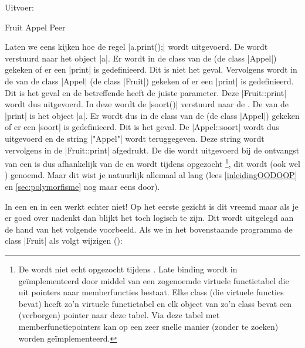 \begin{cpplstShortInline}
Uitvoer:
\begin{coutput}
Fruit
Appel
Peer
\end{coutput}

Laten we eens kijken hoe de regel |a.print();| wordt uitgevoerd.
De   wordt verstuurd naar het object |a|.
Er wordt in de class van de  (de class |Appel|) gekeken of er een  |print| is gedefinieerd.
Dit is niet het geval.
Vervolgens wordt in de  van de class |Appel| (de class |Fruit|) gekeken of er een  |print| is gedefinieerd.
Dit is het geval en de betreffende  heeft de juiste parameter.
Deze  |Fruit::print| wordt dus uitgevoerd.
In deze  wordt de  |soort()| verstuurd naar de .
De  van de  |print| is het object |a|.
Er wordt dus in de class van de  (de class |Appel|) gekeken of er een  |soort| is gedefinieerd.
Dit is het geval. 
De  |Appel::soort| wordt dus uitgevoerd en de string |"Appel"| wordt teruggegeven.
Deze string wordt vervolgens in de  |Fruit::print| afgedrukt.
De  die wordt uitgevoerd bij de ontvangst van een  is dus afhankelijk van de  en wordt tijdens  opgezocht%
\footnote{%
    De  wordt niet echt opgezocht tijdens . 
    Late binding wordt in \Cpp{} geïmplementeerd door middel van een zogenoemde virtuele functietabel die uit pointers naar memberfuncties bestaat.
    Elke class (die virtuele functies bevat) heeft zo'n virtuele functietabel en elk object van zo'n class bevat een (verborgen) pointer naar deze tabel.
    Via deze tabel met memberfunctiepointers kan  op een zeer snelle manier (zonder te zoeken) worden geïmplementeerd.
}, dit wordt \emph{} (ook wel \emph{}) genoemd.
Maar dit wist je natuurlijk allemaal al lang (lees \cref{inleidingOODOOP} en \cref{sec:polymorfisme} nog maar eens door).

In een  en in een  werkt  echter niet! 
Op het eerste gezicht is dit vreemd maar als je er goed over nadenkt dan blijkt het toch logisch te zijn.
Dit wordt uitgelegd aan de hand van het volgende voorbeeld.
Als we in het bovenstaande programma de class |Fruit| als volgt wijzigen ():


\end{cpplstShortInline}
